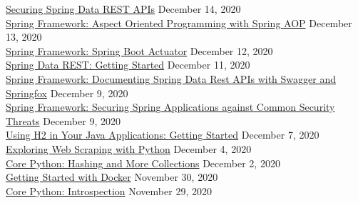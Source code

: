 \documentclass[10pt]{res} %
\begin{document}
\begin{resume}
\href{https://bjdelacruz.dev/files/certificates/pluralsight/Securing_Spring_Data_REST_APIs.pdf}{\color{blue}Securing Spring Data REST APIs} \hfill December 14, 2020 \\
\href{https://bjdelacruz.dev/files/certificates/pluralsight/7_Spring_Framework_Aspect_Oriented_Programming_with_Spring_AOP.pdf}{\color{blue}Spring Framework: Aspect Oriented Programming with Spring AOP} \hfill December 13, 2020 \\
\href{https://bjdelacruz.dev/files/certificates/pluralsight/5_Spring_Framework_Spring_Boot_Actuator.pdf}{\color{blue}Spring Framework: Spring Boot Actuator} \hfill December 12, 2020 \\
\href{https://bjdelacruz.dev/files/certificates/pluralsight/Spring_Data_REST_Getting_Started.pdf}{\color{blue}Spring Data REST: Getting Started} \hfill December 11, 2020 \\
\href{https://bjdelacruz.dev/files/certificates/pluralsight/Spring_Framework_Documenting_Spring_Data_Rest_APIs_with_Swagger_and_Springfox.pdf}{\color{blue}Spring Framework: Documenting Spring Data Rest APIs with Swagger and Springfox} \hfill December 9, 2020 \\
\href{https://bjdelacruz.dev/files/certificates/pluralsight/Spring_Framework_Securing_Spring_Applications_against_Common_Security_Threats.pdf}{\color{blue}Spring Framework: Securing Spring Applications against Common Security Threats} \hfill December 9, 2020 \\
\href{https://bjdelacruz.dev/files/certificates/pluralsight/Using_H2_in_Your_Java_Applications_Getting_Started.pdf}{\color{blue}Using H2 in Your Java Applications: Getting Started} \hfill December 7, 2020 \\
\href{https://bjdelacruz.dev/files/certificates/pluralsight/Exploring_Web_Scraping_with_Python.pdf}{\color{blue}Exploring Web Scraping with Python} \hfill December 4, 2020 \\
\href{https://bjdelacruz.dev/files/certificates/pluralsight/16_Core_Python_Hashing_and_More_Collections.pdf}{\color{blue}Core Python: Hashing and More Collections} \hfill December 2, 2020 \\
\href{https://bjdelacruz.dev/files/certificates/pluralsight/Getting_Started_with_Docker.pdf}{\color{blue}Getting Started with Docker} \hfill November 30, 2020 \\
\href{https://bjdelacruz.dev/files/certificates/pluralsight/9_Core_Python_Introspection.pdf}{\color{blue}Core Python: Introspection} \hfill November 29, 2020 \\

\end{resume}
\end{document}
